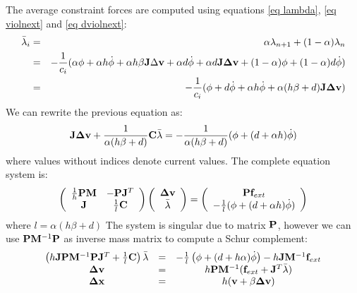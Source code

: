 The average constraint forces are computed  using equations \ref{eq lambda}, \ref{eq violnext} and \ref{eq dviolnext}:
\begin{eqnarray*}
 \avlam_i &=& \alpha \lnext + (1-\alpha) \lcur \\
&=& -\frac{1}{c_i} ( \alpha \violation + \alpha h \dviolation  + \alpha h \beta \J \Delta \vel + \alpha d \dviolation + \alpha d \J \dv + (1-\alpha)\violation + (1-\alpha) d \dviolation  ) \\
&=& -\frac{1}{c_i} ( \violation + d\dviolation + \alpha h \dviolation + \alpha(h\beta+d)\J \dv )
\end{eqnarray*}
We can rewrite the previous equation as:
\begin{equation}
 \J \dv + \frac{1}{\alpha(h\beta+d)}\C\avlam = - \frac{1}{\alpha(h\beta+d)} (\violation + (d+\alpha h)\dviolation)
\end{equation}
where values without indices denote current values.
The complete equation system is:
\begin{equation}
 \left( \begin{array}{cc}
\frac{1}{h}\P\M & -\P\Jt \\
\J & \frac{1}{l} \C \end{array}\right)
\left( \begin{array}{c}
\dv \\ \avlam
\end{array}\right) = \left( \begin{array}{c}
\P\forcext  \\
- \frac{1}{l} (\violation +(d+\alpha h) \dviolation)
\end{array}\right) 
\end{equation}
where $ l=\alpha(h \beta + d) $
The system is singular due to matrix $\P $, however we can use $ \P \Minv\P $ as inverse mass matrix to compute a Schur complement:
\[ \begin{array}{ccc}
\left( h\J\P\Minv\P\Jt + \frac{1}{l}\C \right) \avlam &=& -\frac{1}{l} \left(\violation + (\dampingratio+h\alpha)\dviolation \right) - h\J \Minv \forcext \\
\dv &=& h\P\Minv(\forcext +\Jt \avlam ) \\
\dx &=& h( \vel + \beta \dv )
\end{array} \]


